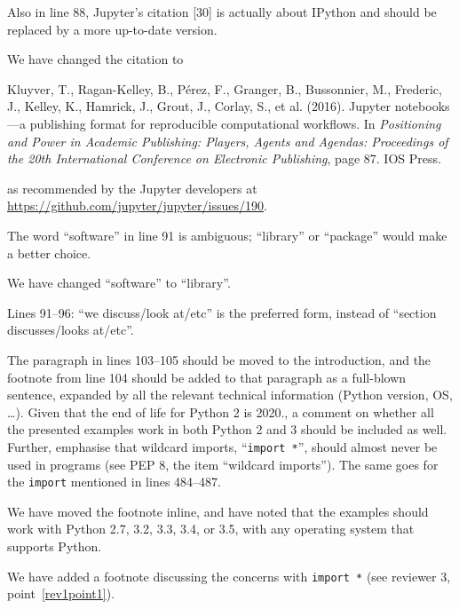 \documentclass[answers,12pt]{exam}
\begin{document}
\begin{questions}
\question Also in line 88, Jupyter's citation [30] is actually about IPython and should be replaced by a more up-to-date version.
\begin{solution}
We have changed the citation to

Kluyver, T., Ragan-Kelley, B., P{\'e}rez, F.,
Granger, B., Bussonnier, M., Frederic, J., Kelley,
K., Hamrick, J., Grout,
J., Corlay, S., et al. (2016). Jupyter notebooks---a publishing format for
reproducible computational workflows. In \textit{Positioning and Power in Academic
Publishing: Players, Agents and Agendas: Proceedings of the 20th International
Conference on Electronic Publishing}, page 87. IOS Press.

as recommended by the Jupyter developers at \url{https://github.com/jupyter/jupyter/issues/190}.
\end{solution}

\question The word ``software'' in line 91 is ambiguous; ``library'' or ``package'' would make a better choice.
\begin{solution}
We have changed ``software'' to ``library''.
\end{solution}

\question Lines 91--96: ``we discuss/look at/etc'' is the preferred form, instead of ``section discusses/looks at/etc''.
\begin{solution}
\end{solution}

\question The paragraph in lines 103--105 should be moved to the introduction,
and the footnote from line 104 should be added to that paragraph as a
full-blown sentence, expanded by all the relevant technical information
(Python version, OS, \ldots). Given that the end of life for Python 2 is
2020., a comment on whether all the presented examples work in both Python 2
and 3 should be included as well. Further, emphasise that wildcard imports,
``\texttt{import *}'', should almost never be used in programs (see PEP 8, the
item ``wildcard imports''). The same goes for the \texttt{import} mentioned in lines 484--487.
\begin{solution}
We have moved the footnote inline, and have noted that the examples should
work with Python 2.7, 3.2, 3.3, 3.4, or 3.5, with any operating system that
supports Python.

We have added a footnote discussing the concerns with \texttt{import *} (see
reviewer 3, point~\ref{rev1point1}).
\end{solution}


\end{questions}
\end{document}
